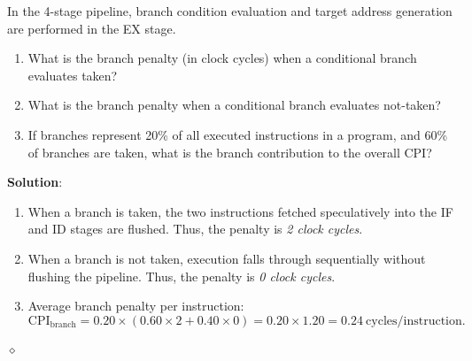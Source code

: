 \begin{problem}
In the 4-stage pipeline, branch condition evaluation and target address generation are performed in the EX stage.
\begin{enumerate}
    \item What is the branch penalty (in clock cycles) when a conditional branch evaluates taken?
    \item What is the branch penalty when a conditional branch evaluates not-taken?
    \item If branches represent 20\% of all executed instructions in a program, and 60\% of branches are taken, what is the branch contribution to the overall CPI?
\end{enumerate}

\textbf{Solution}:
\begin{enumerate}
    \item When a branch is taken, the two instructions fetched speculatively into the IF and ID stages are flushed. Thus, the penalty is \textit{2 clock cycles}.
    \item When a branch is not taken, execution falls through sequentially without flushing the pipeline. Thus, the penalty is \textit{0 clock cycles}.
    \item Average branch penalty per instruction:
    \begin{equation}
    \text{CPI}_{\text{branch}} = 0.20 \times (0.60 \times 2 + 0.40 \times 0) = 0.20 \times 1.20 = 0.24 \ \text{cycles/instruction}.
    \end{equation}
\end{enumerate}
$\diamond$
\end{problem}

